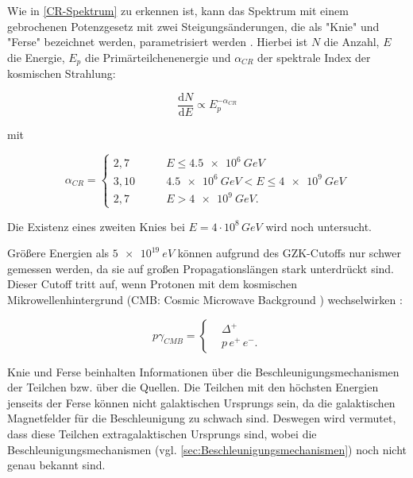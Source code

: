 Wie in \autoref{CR-Spektrum} zu erkennen ist, kann das Spektrum mit einem gebrochenen Potenzgesetz mit zwei Steigungsänderungen, die als "Knie" und "Ferse" bezeichnet werden, parametrisiert werden \cite{Knie}.
Hierbei ist $N$ die Anzahl, $E$ die Energie, $E_p$ die Primärteilchenenergie und $\alpha_{CR}$ der spektrale Index der kosmischen Strahlung:

\begin{equation}
 \frac{\mathrm{d}N}{\mathrm{d}E} \propto E_p^{-\alpha_{CR}}
\end{equation}

mit \cite{Knie} 

\begin{equation*}
\alpha_{CR}=	
\left\{
\begin{aligned}
2,7 \qquad &E   \leq \SI{4,5e6}{GeV} \\
3,10 \qquad &  \SI{4,5e6}{GeV} < E  \leq \SI{4e9}{GeV} \\ 
2,7 \qquad & E > \SI{4e9}{GeV}.
\end{aligned}
\right.
\end{equation*}

Die Existenz eines zweiten Knies bei $E=4\cdot 10^8\,\si{GeV}$\cite{Knie} wird noch untersucht.

Größere Energien als $\SI{5e19}{eV}$ können aufgrund des GZK-Cutoffs \cite{Greisen}\cite{ZatsepinKuzmin} nur schwer gemessen werden, da sie auf großen Propagationslängen stark unterdrückt sind. 
Dieser Cutoff tritt auf, wenn Protonen mit dem kosmischen Mikrowellenhintergrund (CMB: Cosmic Microwave Background ) wechselwirken \cite{Greisen}\cite{ZatsepinKuzmin}: 

\begin{equation*}
p\gamma_{CMB}=	
\left\{
\begin{aligned}
& \Delta^+ \\
& p\, e^+ \, e^- .
\end{aligned}
\right.
\end{equation*}

Knie und Ferse beinhalten Informationen über die Beschleunigungsmechanismen der Teilchen bzw. über die Quellen.
Die Teilchen mit den höchsten Energien jenseits der Ferse können nicht galaktischen Ursprungs sein, da die galaktischen Magnetfelder für die Beschleunigung zu schwach sind. 
Deswegen wird vermutet, dass diese Teilchen extragalaktischen Ursprungs sind, wobei die Beschleunigungsmechanismen (vgl. \autoref{sec:Beschleunigungsmechanismen}) noch nicht genau bekannt sind.

